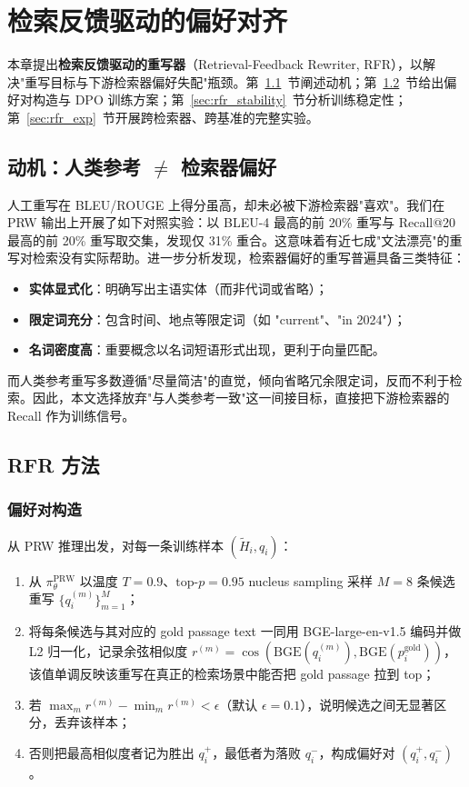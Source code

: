 \chapter{检索反馈驱动的偏好对齐}
\label{chap:rfr}

本章提出\textbf{检索反馈驱动的重写器}（Retrieval-Feedback Rewriter, RFR），以解决"重写目标与下游检索器偏好失配"瓶颈。第~\ref{sec:rfr_motivation}~节阐述动机；第~\ref{sec:rfr_method}~节给出偏好对构造与 DPO 训练方案；第~\ref{sec:rfr_stability}~节分析训练稳定性；第~\ref{sec:rfr_exp}~节开展跨检索器、跨基准的完整实验。

\section{动机：人类参考 $\ne$ 检索器偏好}
\label{sec:rfr_motivation}

人工重写在 BLEU/ROUGE 上得分虽高，却未必被下游检索器"喜欢"。我们在 PRW 输出上开展了如下对照实验：以 BLEU-4 最高的前 20\% 重写与 Recall@20 最高的前 20\% 重写取交集，发现仅 31\% 重合。这意味着有近七成"文法漂亮"的重写对检索没有实际帮助。进一步分析发现，检索器偏好的重写普遍具备三类特征：

\begin{itemize}
    \item \textbf{实体显式化}：明确写出主语实体（而非代词或省略）；
    \item \textbf{限定词充分}：包含时间、地点等限定词（如 "current"、"in 2024"）；
    \item \textbf{名词密度高}：重要概念以名词短语形式出现，更利于向量匹配。
\end{itemize}

而人类参考重写多数遵循"尽量简洁"的直觉，倾向省略冗余限定词，反而不利于检索。因此，本文选择放弃"与人类参考一致"这一间接目标，直接把下游检索器的 Recall 作为训练信号。

\section{RFR 方法}
\label{sec:rfr_method}

\subsection{偏好对构造}

从 PRW 推理出发，对每一条训练样本 $(\tilde H_i, q_i)$：

\begin{enumerate}
    \item 从 $\pi^{\text{PRW}}_\theta$ 以温度 $T=0.9$、$\text{top-}p=0.95$ nucleus sampling 采样 $M=8$ 条候选重写 $\{q_i^{(m)}\}_{m=1}^M$；
    \item 将每条候选与其对应的 gold passage text 一同用 BGE-large-en-v1.5 编码并做 L2 归一化，记录余弦相似度 $r^{(m)} = \cos(\text{BGE}(q_i^{(m)}), \text{BGE}(p_i^{\text{gold}}))$，该值单调反映该重写在真正的检索场景中能否把 gold passage 拉到 top；
    \item 若 $\max_m r^{(m)} - \min_m r^{(m)} < \epsilon$（默认 $\epsilon=0.1$），说明候选之间无显著区分，丢弃该样本；
    \item 否则把最高相似度者记为胜出 $q_i^+$，最低者为落败 $q_i^-$，构成偏好对 $(q_i^+, q_i^-)$。
\end{enumerate}

